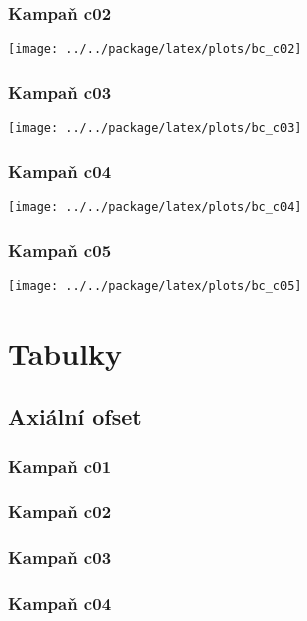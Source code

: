 \documentclass[a4paper,twoside,11pt]{article}
\begin{document}
\subsubsection{Kampaň c02}
\texttt{[image: ../../package/latex/plots/bc\_c02]}

\subsubsection{Kampaň c03}
\texttt{[image: ../../package/latex/plots/bc\_c03]}

\subsubsection{Kampaň c04}
\texttt{[image: ../../package/latex/plots/bc\_c04]}

\subsubsection{Kampaň c05}
\texttt{[image: ../../package/latex/plots/bc\_c05]}



\section{Tabulky}

\subsection{Axiální ofset}

\subsubsection{Kampaň c01}


\subsubsection{Kampaň c02}


\subsubsection{Kampaň c03}


\subsubsection{Kampaň c04}

\end{document}
